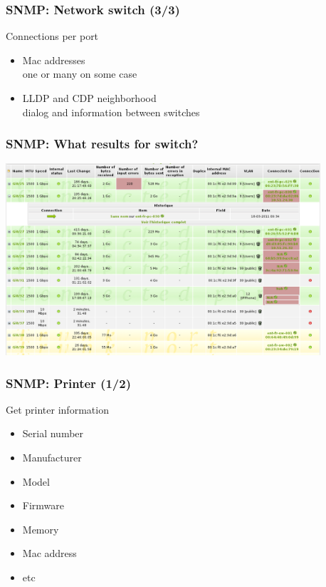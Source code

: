 \documentclass{beamer}
\begin{document}
\begin{frame}
    \frametitle{SNMP: Network switch (3/3)}

    \begin{block}{Connections per port}
    \begin{itemize}
    \item Mac addresses \\ 
    one or many on some case
    \item LLDP and CDP neighborhood \\
        dialog and information between switches
    \end{itemize}
    \end{block}
\end{frame}

\begin{frame}
    \frametitle{SNMP: What results for switch?}

    \begin{center}
    \includegraphics[width=11.7cm]{./pics/switch_ports.png}
    \end{center}
\end{frame}

\begin{frame}
    \frametitle{SNMP: Printer (1/2)}

    \begin{block}{Get printer information}
    \begin{itemize}
    \item Serial number
    \item Manufacturer
    \item Model
    \item Firmware
    \item Memory
    \item Mac address
    \item etc
    \end{itemize}
    \end{block}
\end{frame}
\end{document}
